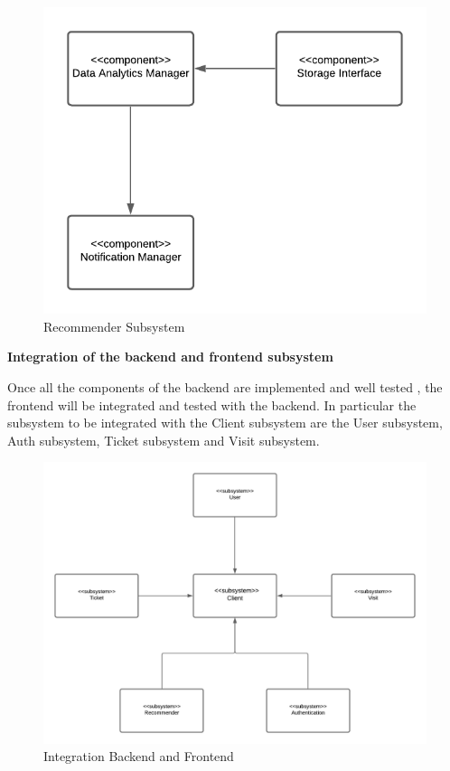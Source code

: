 \documentclass[a4paper, 12pt, oneside, table]{article}
\begin{document}
\begin{figure}[h!]
\centering
    \centering
    \includegraphics[height=0.3\textheight, width=0.8\linewidth, keepaspectratio]{img/recommender_system.png}
    \caption{Recommender Subsystem}
    \label{recommender_subsystem}
\end{figure}

\newpage
\textbf{Integration of the backend and frontend subsystem}

Once all the components of the backend are implemented and well tested , the frontend will be integrated and tested with the backend.
In particular the subsystem to be integrated with the Client subsystem are the User subsystem, Auth subsystem, Ticket subsystem and Visit subsystem.\\


\begin{figure}[h!]
\centering
    \centering
    \includegraphics[height=0.4\textheight, width=0.9\linewidth, keepaspectratio]{img/integration_backend_frontend.png}
    \caption{Integration Backend and Frontend}
    \label{integration_backend_frontend}
\end{figure}
\end{document}
